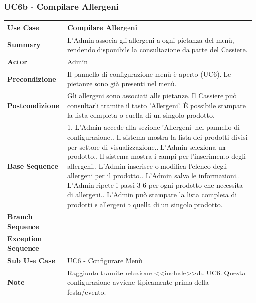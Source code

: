 \newpage 

\subsubsection*{UC6b - Compilare Allergeni}
\begin{center}
\begin{tabular}{|p{}|p{}|}
\hline
\textbf{Use Case} & Compilare Allergeni \\ \hline
\textbf{Summary} & L'Admin associa gli allergeni a ogni pietanza del menù, rendendo disponibile la consultazione da parte del Cassiere. \\ \hline
\textbf{Actor} & Admin \\ \hline
\textbf{Precondizione} & Il pannello di configurazione menù è aperto (UC6). Le pietanze sono già presenti nel menù. \\ \hline
\textbf{Postcondizione} & Gli allergeni sono associati alle pietanze. Il Cassiere può consultarli tramite il tasto 'Allergeni'. È possibile stampare la lista completa o quella di un singolo prodotto. \\ \hline
\textbf{Base Sequence} & 1. L'Admin accede alla sezione 'Allergeni' nel pannello di configurazione.\newline 2. Il sistema mostra la lista dei prodotti divisi per settore di visualizzazione.\newline 3. L'Admin seleziona un prodotto.\newline 4. Il sistema mostra i campi per l'inserimento degli allergeni.\newline 5. L'Admin inserisce o modifica l'elenco degli allergeni per il prodotto.\newline 6. L'Admin salva le informazioni.\newline 7. L'Admin ripete i passi 3-6 per ogni prodotto che necessita di allergeni.\newline 8. L'Admin può stampare la lista completa di prodotti e allergeni o quella di un singolo prodotto. \\ \hline
\textbf{Branch Sequence} & \\ \hline
\textbf{Exception Sequence} & \\ \hline
\textbf{Sub Use Case} & UC6 - Configurare Menù \\ \hline
\textbf{Note} & Raggiunto tramite relazione \textless\textless include\textgreater\textgreater da UC6. Questa configurazione avviene tipicamente prima della festa/evento. \\ \hline
\end{tabular}
\end{center}

